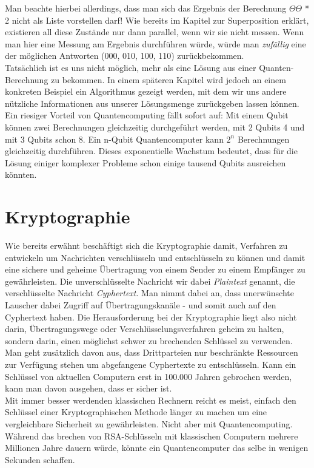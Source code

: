 \documentclass[12pt]{article}
\begin{document}
Man beachte hierbei allerdings, dass man sich das Ergebnis der Berechnung \(\Theta\Theta\) * 2 nicht als Liste vorstellen darf! Wie bereits im Kapitel zur Superposition erklärt, existieren all diese Zustände nur dann parallel, wenn wir sie nicht messen. Wenn man hier eine Messung am Ergebnis durchführen würde, würde man \textit{zufällig} eine der möglichen Antworten (000, 010, 100, 110) zurückbekommen. \\

Tatsächlich ist es uns nicht möglich, mehr als eine Lösung aus einer Quanten-Berechnung zu bekommen. In einem späteren Kapitel wird jedoch an einem konkreten Beispiel ein Algorithmus gezeigt werden, mit dem wir uns andere nützliche Informationen aus unserer Lösungsmenge zurückgeben lassen können.\\

Ein riesiger Vorteil von Quantencomputing fällt sofort auf: Mit einem Qubit können zwei Berechnungen gleichzeitig durchgeführt werden, mit 2 Qubits 4 und mit 3 Qubits schon 8. Ein n-Qubit Quantencomputer kann \(2^n\) Berechnungen gleichzeitig durchführen. Dieses exponentielle Wachstum bedeutet, dass für die Lösung einiger komplexer Probleme schon einige tausend Qubits ausreichen könnten. \cite{mavroeidis2018impact}

\clearpage
\section{Kryptographie}

Wie bereits erwähnt beschäftigt sich die Kryptographie damit, Verfahren zu entwickeln um Nachrichten verschlüsseln und entschlüsseln zu können und damit eine sichere und geheime Übertragung von einem Sender zu einem Empfänger zu gewährleisten. Die unverschlüsselte Nachricht wir dabei \textit{Plaintext} genannt, die verschlüsselte Nachricht \textit{Cyphertext}. Man nimmt dabei an, dass unerwünschte Lauscher dabei Zugriff auf Übertragungskanäle - und somit auch auf den Cyphertext haben. Die Herausforderung bei der Kryptographie liegt also nicht darin, Übertragungswege oder Verschlüsselungsverfahren geheim zu halten, sondern darin, einen möglichst schwer zu brechenden Schlüssel zu verwenden. \cite{Uhl2022Krypto} \\

Man geht zusätzlich davon aus, dass Drittparteien nur beschränkte Ressourcen zur Verfügung stehen um abgefangene Cyphertexte zu entschlüsseln. Kann ein Schlüssel von aktuellen Computern erst in 100.000 Jahren gebrochen werden, kann man davon ausgehen, dass er sicher ist. \cite{mavroeidis2018impact} \\
Mit immer besser werdenden klassischen Rechnern reicht es meist, einfach den Schlüssel einer Kryptographischen Methode länger zu machen um eine vergleichbare Sicherheit zu gewährleisten. Nicht aber mit Quantencomputing. Während das brechen von RSA-Schlüsseln mit klassischen Computern mehrere Millionen Jahre dauern würde, könnte ein Quantencomputer das selbe in wenigen Sekunden schaffen.
\end{document}
